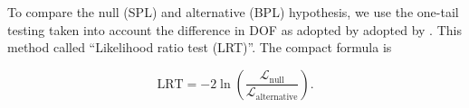 To compare the null (SPL) and alternative (BPL) hypothesis,
we use the one-tail testing taken into account the difference
in DOF as adopted by
 adopted by \cite{Huelsenbeck}.
This method called ``Likelihood ratio test (LRT)''. The compact formula 
is 

\begin{equation}
    \text{LRT} = -2\ln\left(\frac{\mathcal{L}_\text{null}}{\mathcal{L}_\text{alternative}}\right).
    \label{eq:lrt}
\end{equation}








